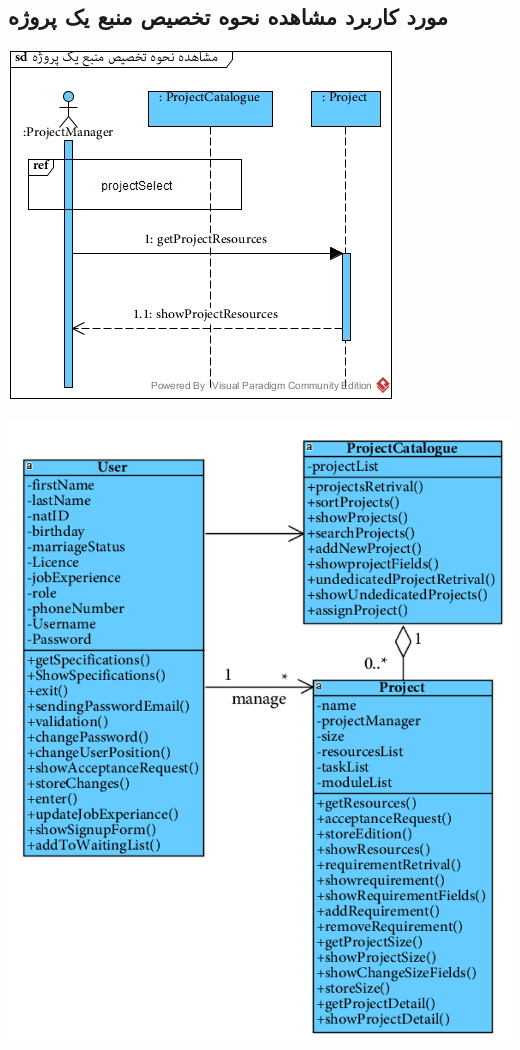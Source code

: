 \subsection*{مورد کاربرد مشاهده نحوه تخصیص منبع یک پروژه}
\vspace{2cm}
\begin{center}
\includegraphics[width=\textwidth]{SequenceDiagrams/38.jpg}
\end{center}

\newpage
\vspace{2cm}
\begin{center}
\includegraphics[width=\textwidth]{SequenceClasses/38.png}
\end{center}



